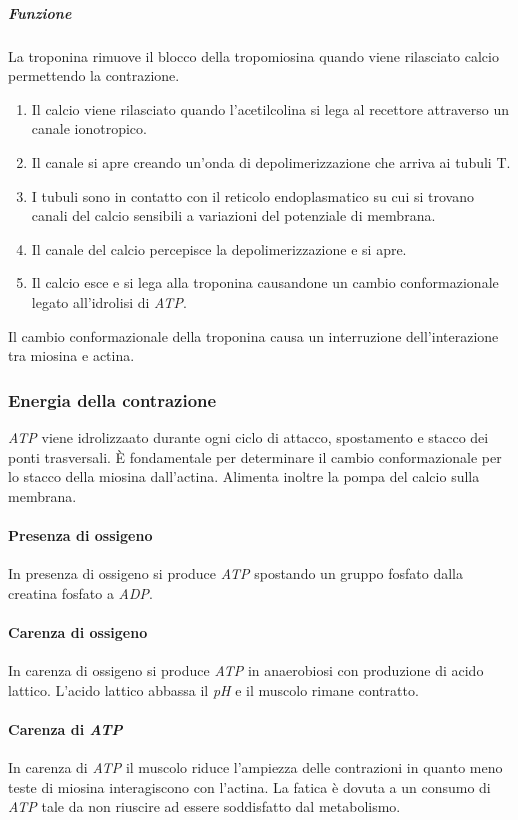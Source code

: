 				\subparagraph{Funzione}
				La troponina rimuove il blocco della tropomiosina quando viene rilasciato calcio permettendo la contrazione.
				\begin{multicols}{2}
					\begin{enumerate}
						\item Il calcio viene rilasciato quando l'acetilcolina si lega al recettore attraverso un canale ionotropico.
						\item Il canale si apre creando un'onda di depolimerizzazione che arriva ai tubuli T.
						\item I tubuli sono in contatto con il reticolo endoplasmatico su cui si trovano canali del calcio sensibili a variazioni del potenziale di membrana.
						\item Il canale del calcio percepisce la depolimerizzazione e si apre.
						\item Il calcio esce e si lega alla troponina causandone un cambio conformazionale legato all'idrolisi di \emph{ATP}.
					\end{enumerate}
				\end{multicols}
				Il cambio conformazionale della troponina causa un interruzione dell'interazione tra miosina e actina.

		\subsubsection{Energia della contrazione}
		\emph{ATP} viene idrolizzaato durante ogni ciclo di attacco, spostamento e stacco dei ponti trasversali.
		\`E fondamentale per determinare il cambio conformazionale per lo stacco della miosina dall'actina.
		Alimenta inoltre la pompa del calcio sulla membrana.

			\paragraph{Presenza di ossigeno}
			In presenza di ossigeno si produce \emph{ATP} spostando un gruppo fosfato dalla creatina fosfato a \emph{ADP}.

			\paragraph{Carenza di ossigeno}
			In carenza di ossigeno si produce \emph{ATP} in anaerobiosi con produzione di acido lattico.
			L'acido lattico abbassa il \emph{pH} e il muscolo rimane contratto.

			\paragraph{Carenza di \emph{ATP}}
			In carenza di \emph{ATP} il muscolo riduce l'ampiezza delle contrazioni in quanto meno teste di miosina interagiscono con l'actina.
			La fatica \`e dovuta a un consumo di \emph{ATP} tale da non riuscire ad essere soddisfatto dal metabolismo.

